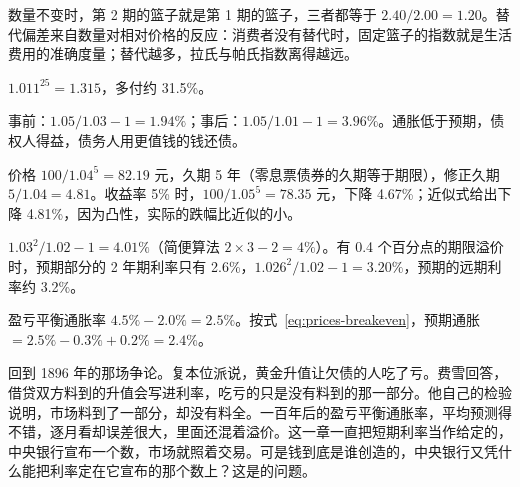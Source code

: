 \begin{answers}
\item 数量不变时，第 2 期的篮子就是第 1 期的篮子，三者都等于 $2.40/2.00=1.20$。替代偏差来自数量对相对价格的反应：消费者没有替代时，固定篮子的指数就是生活费用的准确度量；替代越多，拉氏与帕氏指数离得越远。
\item $1.011^{25}=1.315$，多付约 31.5\%。
\item 事前：$1.05/1.03-1=1.94\%$；事后：$1.05/1.01-1=3.96\%$。通胀低于预期，债权人得益，债务人用更值钱的钱还债。
\item 价格 $100/1.04^5=82.19$ 元，久期 5 年（零息票债券的久期等于期限），修正久期 $5/1.04=4.81$。收益率 5\% 时，$100/1.05^5=78.35$ 元，下降 4.67\%；近似式给出下降 4.81\%，因为凸性，实际的跌幅比近似的小。
\item $1.03^2/1.02-1=4.01\%$（简便算法 $2\times3-2=4\%$）。有 0.4 个百分点的期限溢价时，预期部分的 2 年期利率只有 2.6\%，$1.026^2/1.02-1=3.20\%$，预期的远期利率约 3.2\%。
\item 盈亏平衡通胀率 $4.5\%-2.0\%=2.5\%$。按式~\eqref{eq:prices-breakeven}，预期通胀 $=2.5\%-0.3\%+0.2\%=2.4\%$。
\end{answers}

回到 1896 年的那场争论。复本位派说，黄金升值让欠债的人吃了亏。费雪回答，借贷双方料到的升值会写进利率，吃亏的只是没有料到的那一部分。他自己的检验说明，市场料到了一部分，却没有料全。一百年后的盈亏平衡通胀率，平均预测得不错，逐月看却误差很大，里面还混着溢价。这一章一直把短期利率当作给定的，中央银行宣布一个数，市场就照着交易。可是钱到底是谁创造的，中央银行又凭什么能把利率定在它宣布的那个数上？这是的问题。
